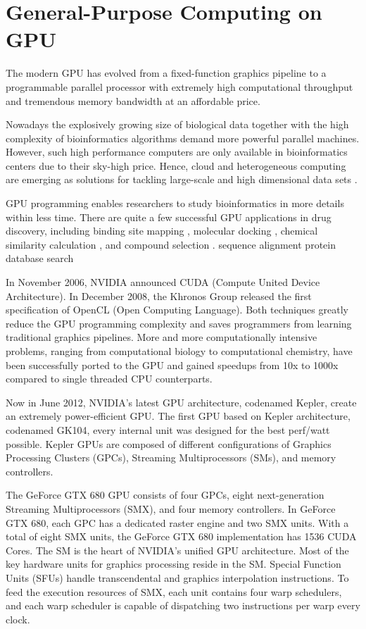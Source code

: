 \section{General-Purpose Computing on GPU}

The modern GPU has evolved from a fixed-function graphics pipeline to a programmable parallel processor with extremely high computational throughput and tremendous memory bandwidth at an affordable price.

Nowadays the explosively growing size of biological data together with the high complexity of bioinformatics algorithms demand more powerful parallel machines. However, such high performance computers are only available in bioinformatics centers due to their sky-high price. Hence, cloud and heterogeneous computing are emerging as solutions for tackling large-scale and high dimensional data sets \citep{269,267,268}.

GPU programming enables researchers to study bioinformatics in more details within less time. There are quite a few successful GPU applications in drug discovery, including binding site mapping \citep{722}, molecular docking \citep{723,652,779}, chemical similarity calculation \citep{726}, and compound selection \citep{750}.
sequence alignment \citep{123,1064}
protein database search \citep{189}

In November 2006, NVIDIA announced CUDA (Compute United Device Architecture). In December 2008, the Khronos Group released the first specification of OpenCL (Open Computing Language). Both techniques greatly reduce the GPU programming complexity and saves programmers from learning traditional graphics pipelines. More and more computationally intensive problems, ranging from computational biology to computational chemistry, have been successfully ported to the GPU and gained speedups from 10x to 1000x compared to single threaded CPU counterparts.

Now in June 2012, NVIDIA’s latest GPU architecture, codenamed Kepler, create an extremely power-efficient GPU. The first GPU based on Kepler architecture, codenamed GK104, every internal unit was designed for the best perf/watt possible. Kepler GPUs are composed of different configurations of Graphics Processing Clusters (GPCs), Streaming Multiprocessors (SMs), and memory controllers.

The GeForce GTX 680 GPU consists of four GPCs, eight next-generation Streaming Multiprocessors (SMX), and four memory controllers. In GeForce GTX 680, each GPC has a dedicated raster engine and two SMX units. With a total of eight SMX units, the GeForce GTX 680 implementation has 1536 CUDA Cores. The SM is the heart of NVIDIA’s unified GPU architecture. Most of the key hardware units for graphics processing reside in the SM. Special Function Units (SFUs) handle transcendental and graphics interpolation instructions. To feed the execution resources of SMX, each unit contains four warp schedulers, and each warp scheduler is capable of dispatching two instructions per warp every clock.

